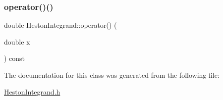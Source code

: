 \subsubsection{\texorpdfstring{operator()()}{operator()()}}
{\footnotesize\ttfamily double Heston\+Integrand\+::operator() (\begin{DoxyParamCaption}\item[{double}]{x }\end{DoxyParamCaption}) const}



The documentation for this class was generated from the following file\+:\begin{DoxyCompactItemize}
\item 
\hyperlink{HestonIntegrand_8h}{Heston\+Integrand.\+h}\end{DoxyCompactItemize}
